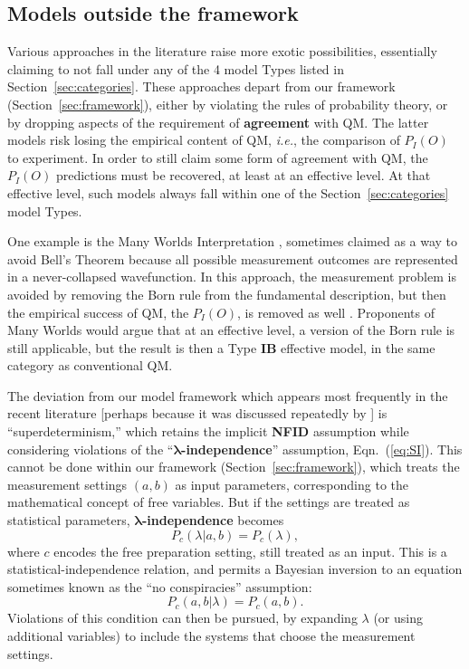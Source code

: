 \documentclass[rmp, aps, preprint, longbibliography]{revtex4-1}
\begin{document}
\subsection{Models outside the framework}
\label{sec:superdeterminism}

Various approaches in the literature raise more exotic possibilities, essentially claiming to not fall under any of the 4 model Types listed in Section~\ref{sec:categories}.  These approaches depart from our framework (Section~\ref{sec:framework}), either by violating the rules of probability theory, or by dropping aspects of the requirement of {\bf agreement} with QM\@.  The latter models risk losing the empirical content of QM, \emph{i.e.}, the comparison of $P_I(O)$ to experiment.  In order to still claim some form of agreement with QM, the $P_I(O)$ predictions must be recovered, at least at an effective level.  At that effective level, such models always fall within one of the Section~\ref{sec:categories} model Types.

One example is the Many Worlds Interpretation \cite{everett1957}, sometimes claimed as a way to avoid Bell's Theorem because all possible measurement outcomes are represented in a never-collapsed wavefunction.  In this approach, the measurement problem is avoided by removing the Born rule from the fundamental description, but then the empirical success of QM, the $P_I(O)$, is removed as well \cite{maudlin2010}.  Proponents of Many Worlds would argue that at an effective level, a version of the Born rule is still applicable, but the result is then a Type {\bf IB} effective model, in the same category as conventional QM\@. 

The deviation from our model framework which appears most frequently in the recent literature [perhaps because it was discussed repeatedly by \textcite{bell1981,bell1990,bell1977}] is ``superdeterminism,'' which retains the implicit {\bf NFID} assumption while considering violations of the ``{\bf $\bm{\lambda}$-independence}'' assumption, Eqn.~(\ref{eq:SI}).  This cannot be done within our framework (Section~\ref{sec:framework}), which treats the measurement settings $(a,b)$ as input parameters, corresponding to the mathematical concept of free variables.  But if the settings are treated as statistical parameters, {\bf $\bm{\lambda}$-independence} becomes
\begin{equation}
\label{eq:MeasInd}
 P_{c}(\lambda |a,b)=P_c(\lambda),
 \end{equation}
where $c$ encodes the free preparation setting, still treated as an input.  This is a statistical-independence relation, and permits a Bayesian inversion to an equation sometimes known as the ``no conspiracies'' assumption:
\begin{equation}
\label{eq:FreeWill}
 P_{c}(a,b|\lambda)=P_c(a,b).
 \end{equation}
Violations of this condition can then be pursued, by expanding $\lambda$ (or using additional variables) to include the systems that choose the measurement settings.
\end{document}
